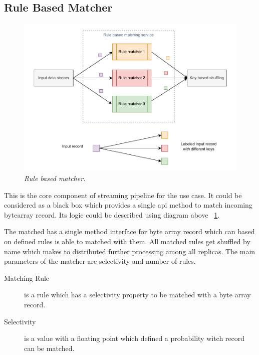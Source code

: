 

\subsection{Rule Based Matcher}\label{subsec:rule-matcher}

\begin{figure}[H]
    \centering
    \includegraphics[width=1\textwidth]{figures/rule-matcher}
    \caption{\textit{Rule based matcher.}}
    \label{fig:rule-matcher}
\end{figure}

This is the core component of streaming pipeline for the use case.
It could be considered as a black box which provides a single api method to match
incoming bytearray record.
Its logic could be described using diagram above ~\ref{fig:rule-matcher}.

The matched has a single method interface for byte array record which
can based on defined rules is able to matched with them.
All matched rules get shuffled by name which makes to distributed
further processing among all replicas.
The main parameters of the matcher are selectivity and number of rules.

\begin{description}
    \item[Matching Rule] is a rule which has a selectivity property to be matched with a byte array record.
    \item[Selectivity] is a value with a floating point which defined a probability witch record can be
    matched.
\end{description}

